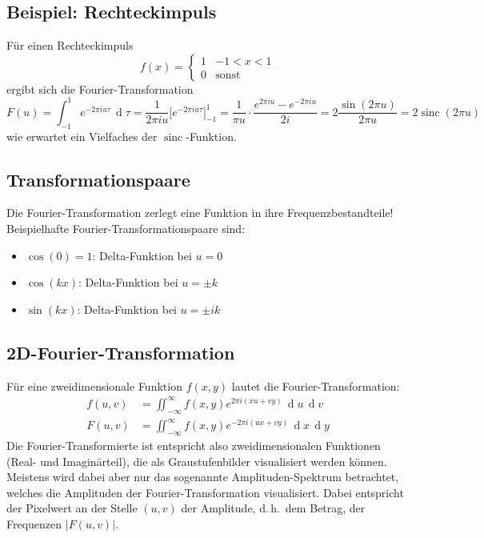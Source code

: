 \documentclass[a4paper, 11pt, accentcolor = tud3b]{tudreport}
\DeclareMathOperator{\total}{d}
\DeclareMathOperator{\sinc}{sinc}
\newcommand{\dif}[1]{\,\total#1}
\renewcommand{\dh}{d.\,h.~}
\begin{document}
			\subsection{Beispiel: Rechteckimpuls}
				Für einen Rechteckimpuls
				\begin{equation*}
					f(x) =
						\begin{cases}
							1 & -1 < x < 1 \\
							0 & \text{sonst}
						\end{cases}
				\end{equation*}
				ergibt sich die Fourier-Transformation
				\begin{equation*}
					F(u) = \int_{-1}^{1} \! e^{-2\pi i u \tau} \dif{\tau} = \frac{1}{2\pi i u} \big[ e^{-2\pi i u \tau} \big]_{-1}^{1} = \frac{1}{\pi u} \cdot \frac{e^{2\pi i u} - e^{-2\pi i u}}{2i} = 2 \frac{\sin(2\pi u)}{2\pi u} = 2 \sinc(2\pi u)
				\end{equation*}
				wie erwartet ein Vielfaches der \( \sinc \)-Funktion.

			\subsection{Transformationspaare}
				Die Fourier-Transformation zerlegt eine Funktion in ihre Frequenzbestandteile! Beispielhafte Fourier-Transformationspaare sind:
				\begin{itemize}
					\item \( \cos(0) = 1 \): \tabto{2.5cm} Delta-Funktion bei \( u = 0 \)
					\item \( \cos(kx) \):    \tabto{2.5cm} Delta-Funktion bei \( u = \pm k \)
					\item \( \sin(kx) \):    \tabto{2.5cm} Delta-Funktion bei \( u = \pm ik \)
				\end{itemize}
			
			\subsection{2D-Fourier-Transformation}
				Für eine zweidimensionale Funktion \( f(x, y) \) lautet die Fourier-Transformation:
				\begin{align*}
					f(u, v) &= \iint_{-\infty}^{\infty} \! f(x, y) e^{ 2\pi i (xu + vy)} \dif{u} \dif{v} \\
					F(u, v) &= \iint_{-\infty}^{\infty} \! f(x, y) e^{-2\pi i (ux + vy)} \dif{x} \dif{y}
				\end{align*}
				Die Fourier-Transformierte ist entspricht also zweidimensionalen Funktionen (Real- und Imaginärteil), die als Graustufenbilder visualisiert werden können. Meistens wird dabei aber nur das sogenannte Amplituden-Spektrum betrachtet, welches die Amplituden der Fourier-Transformation visualisiert. Dabei entspricht der Pixelwert an der Stelle \( (u, v) \) der Amplitude, \dh dem Betrag, der Frequenzen \( \big\lvert F(u, v) \big\rvert \).
\end{document}
